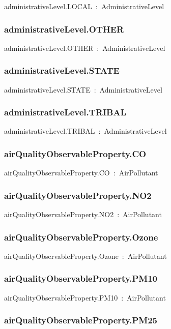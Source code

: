 \documentclass{article}
\begin{document}
administrativeLevel.LOCAL~:~AdministrativeLevel

\subsubsection*{administrativeLevel.OTHER}

administrativeLevel.OTHER~:~AdministrativeLevel

\subsubsection*{administrativeLevel.STATE}

administrativeLevel.STATE~:~AdministrativeLevel

\subsubsection*{administrativeLevel.TRIBAL}

administrativeLevel.TRIBAL~:~AdministrativeLevel

\subsubsection*{airQualityObservableProperty.CO}

airQualityObservableProperty.CO~:~AirPollutant

\subsubsection*{airQualityObservableProperty.NO2}

airQualityObservableProperty.NO2~:~AirPollutant

\subsubsection*{airQualityObservableProperty.Ozone}

airQualityObservableProperty.Ozone~:~AirPollutant

\subsubsection*{airQualityObservableProperty.PM10}

airQualityObservableProperty.PM10~:~AirPollutant

\subsubsection*{airQualityObservableProperty.PM25}
\end{document}
